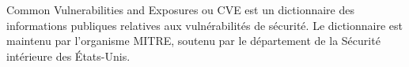 Common Vulnerabilities and Exposures ou CVE est un dictionnaire des informations publiques relatives aux vulnérabilités de sécurité. Le dictionnaire est maintenu par l'organisme MITRE, soutenu par le département de la Sécurité intérieure des États-Unis.